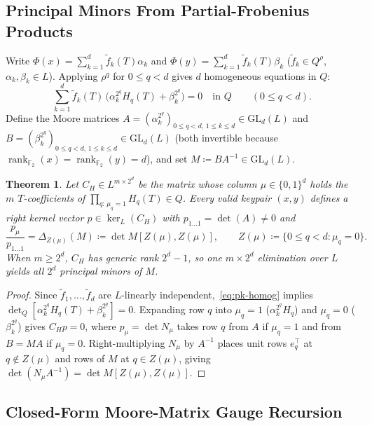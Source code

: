 \documentclass[11pt,a4paper]{article}
\newtheorem{theorem}{Theorem}
\theoremstyle{definition}
\theoremstyle{remark}
\newcommand{\Ftwo}{\mathbb{F}_2}
\newcommand{\GL}{\mathrm{GL}}
\newcommand{\rk}{\operatorname{rank}}
\begin{document}
\subsection{Principal Minors From Partial-Frobenius Products}
\label{subsec:pk-closed}

Write $\Phi(x) = \sum_{k=1}^d \tilde{f}_k(T) \alpha_k$ and $\Phi(y) = \sum_{k=1}^d \tilde{f}_k(T) \beta_k$ ($\tilde{f}_k \in Q^\rho$, $\alpha_k, \beta_k \in L$). Applying $\rho^q$ for $0 \le q < d$ gives $d$ homogeneous equations in $Q$:
\begin{equation}
\label{eq:pk-homog}
    \sum_{k=1}^{d} \tilde{f}_k(T)\,\bigl(\alpha_k^{2^q} H_q(T) + \beta_k^{2^q}\bigr) = 0 \quad \text{in } Q \qquad (0 \le q < d).
\end{equation}
Define the Moore matrices $A = (\alpha_k^{2^q})_{0 \le q < d,\, 1 \le k \le d} \in \GL_d(L)$ and $B = (\beta_k^{2^q})_{0 \le q < d,\, 1 \le k \le d} \in \GL_d(L)$ (both invertible because $\rk_{\Ftwo}(x) = \rk_{\Ftwo}(y) = d$), and set $M \coloneqq B A^{-1} \in \GL_d(L)$.

\begin{theorem}
\label{thm:pk-minors}
Let $C_H \in L^{m \times 2^d}$ be the matrix whose column $\mu \in \{0,1\}^d$ holds the $m$ $T$-coefficients of $\prod_{q:\,\mu_q = 1} H_q(T) \in Q$. Every valid keypair $(x, y)$ defines a right kernel vector $p \in \ker_L(C_H)$ with $p_{1\dots 1} = \det(A) \neq 0$ and
\[
    \frac{p_\mu}{p_{1\dots 1}} = \Delta_{Z(\mu)}(M) \coloneqq \det M[Z(\mu), Z(\mu)], \qquad Z(\mu) \coloneqq \{0 \le q < d : \mu_q = 0\}.
\]
When $m \ge 2^d$, $C_H$ has generic rank $2^d - 1$, so one $m \times 2^d$ elimination over $L$ yields all $2^d$ principal minors of $M$.
\end{theorem}

\begin{proof}
Since $\tilde{f}_1, \dots, \tilde{f}_d$ are $L$-linearly independent,~\eqref{eq:pk-homog} implies $\det_Q[\alpha_k^{2^q} H_q(T) + \beta_k^{2^q}] = 0$. Expanding row $q$ into $\mu_q = 1$ ($\alpha_k^{2^q} H_q$) and $\mu_q = 0$ ($\beta_k^{2^q}$) gives $C_H p = 0$, where $p_\mu = \det N_\mu$ takes row $q$ from $A$ if $\mu_q = 1$ and from $B = M A$ if $\mu_q = 0$. Right-multiplying $N_\mu$ by $A^{-1}$ places unit rows $e_q^\top$ at $q \notin Z(\mu)$ and rows of $M$ at $q \in Z(\mu)$, giving $\det(N_\mu A^{-1}) = \det M[Z(\mu), Z(\mu)]$.
\end{proof}

\subsection{Closed-Form Moore-Matrix Gauge Recursion}
\label{subsec:pk-moore}
\end{document}
